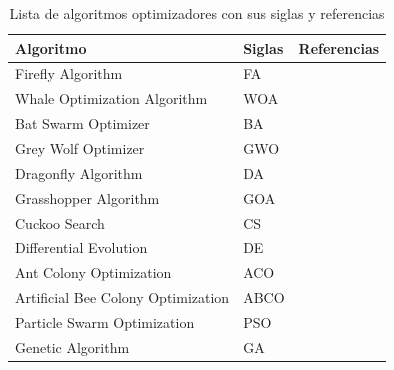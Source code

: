 \begin{table}[htp]
  \centering
  \begin{tabular}{l|l|l}
    \hline
    \textbf{Algoritmo}                 & \textbf{Siglas} & \textbf{Referencias}                                                                             \\ \hline
    Firefly Algorithm                  & FA              & \cite{yang_chapter_2014, zhang2016optimal, Zhang2017561, Selvakumar2019148, Hu201517}            \\
    Whale Optimization Algorithm       & WOA             & \cite{mirjalili_whale_2016, hussien_s-shaped_2019, mafarja_whale_2018}                           \\
    Bat Swarm Optimizer                & BA              & \cite{yang_new_2010, mirjalili_binary_2014, Nakamura2012291, Rodrigues20142250}                  \\
    Grey Wolf Optimizer                & GWO             & \cite{mirjalili_grey_2014, emary_binary_2016, Al-Tashi201939496, Hu2020}                         \\
    Dragonfly Algorithm                & DA              & \cite{mirjalili_dragonfly_2016, mafarja_binary_2018, Hammouri2020, Mafarja201712, Sayed2019188}  \\
    Grasshopper Algorithm              & GOA             & \cite{saremi_grasshopper_2017, mafarja_binary_2019, Aljarah2018478, Mafarja201825}               \\
    Cuckoo Search                      & CS              & \cite{yang_cuckoo_2010, rodrigues_bcs_2013}                                                      \\
    Differential Evolution             & DE              & \cite{storn_differential_1997, pampara_binary_2006, Zorarpaci201691, Zhang202067, Hancer2018103} \\
    Ant Colony Optimization            & ACO             & \cite{dorigo_ant_1999}                                                                           \\
    Artificial Bee Colony Optimization & ABCO            & \cite{karaboga_idea_nodate, kiran_binary_2021, Rao2019634, Zorarpaci201691, Hancer2018462}       \\
    Particle Swarm Optimization        & PSO             & \cite{kennedy_particle_1995, mirjalili_s-shaped_2013, Lin20081817, Xue20131656, Wang2007459}     \\
    Genetic Algorithm                  & GA              & \cite{Holland:1975}                                                                              \\ \hline
  \end{tabular}
  \caption{Lista de algoritmos optimizadores con sus siglas y referencias}
  \label{tab:algoritmos}
\end{table}

